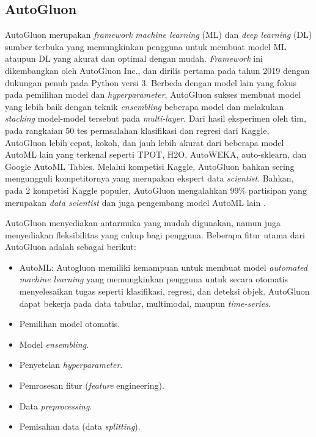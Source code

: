 \subsection{AutoGluon} \label{AutoGluon}
AutoGluon merupakan \emph{framework} \emph{machine learning} (ML) dan \emph{deep learning} (DL) sumber terbuka yang memungkinkan pengguna untuk membuat model
ML ataupun DL yang akurat dan optimal dengan mudah. \emph{Framework} ini dikembangkan oleh AutoGluon Inc., dan dirilis pertama pada tahun 2019 dengan dukungan
penuh pada Python versi 3. Berbeda dengan model lain yang fokus pada pemilihan model dan \emph{hyperparameter}, AutoGluon sukses membuat model yang lebih baik
dengan teknik \emph{ensembling} beberapa model dan melakukan \emph{stacking} model-model tersebut pada \emph{multi-layer}. Dari hasil eksperimen oleh tim, pada
rangkaian 50 tes permsalahan klasifikasi dan regresi dari Kaggle, AutoGluon lebih cepat, kokoh, dan jauh lebih akurat dari beberapa model AutoML lain yang
terkenal seperti TPOT, H2O, AutoWEKA, auto-sklearn, dan Google AutoML Tables. Melalui kompetisi Kaggle, AutoGluon bahkan sering mengungguli kompetitornya yang
merupakan ekspert data \emph{scientist}. Bahkan, pada 2 kompetisi Kaggle populer, AutoGluon mengalahkan 99\% partisipan yang merupakan \emph{data scientist}
dan juga pengembang model AutoML lain \cite{agtabular}.

AutoGluon menyediakan antarmuka yang mudah digunakan, namun juga menyediakan fleksibilitas yang cukup bagi pengguna. Beberapa fitur utama dari AutoGluon adalah
sebagai berikut:

\begin{itemize}
	\item AutoML: Autogluon memiliki kemampuan untuk membuat model \emph{automated machine learning} yang memungkinkan pengguna untuk secara otomatis menyelesaikan tugas
	      seperti klasifikasi, regresi, dan deteksi objek. AutoGluon dapat bekerja pada data tabular, multimodal, maupun \emph{time-series}.
	\item Pemilihan model otomatis.
	\item Model \emph{ensembling}.
	\item Penyetelan \emph{hyperparameter}.
	\item Pemrosesan fitur (\emph{feature} engineering).
	\item Data \emph{preprocessing}.
	\item Pemisahan data (data \emph{splitting}).
\end{itemize}

